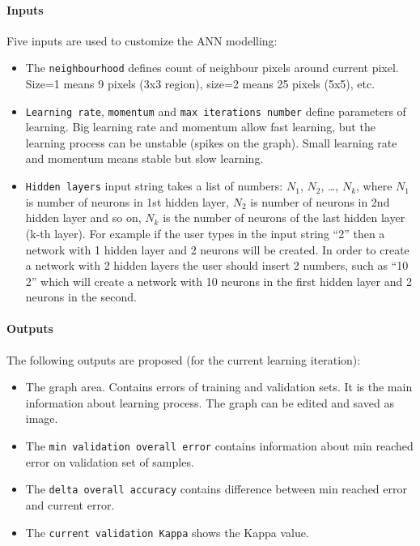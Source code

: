 \documentclass{report}
\begin{document}
\paragraph{Inputs} Five inputs are used to customize the ANN modelling:
\begin{itemize}
  \item The \verb+neighbourhood+ defines count of neighbour pixels around current pixel. Size=1 means 9
    pixels (3x3 region), size=2 means 25 pixels (5x5), etc.
  \item \verb+Learning rate+, \verb+momentum+ and \verb+max iterations number+ define parameters of learning. Big
    learning rate and momentum allow fast learning, but the learning process can be unstable
    (spikes on the graph). Small learning rate and momentum means stable but slow learning.
  \item \verb+Hidden layers+ input string takes a list of numbers: $N_1$, $N_2$,  \dots, $N_k$, where $N_1$ is number of
    neurons in 1st hidden layer, $N_2$ is number of neurons in 2nd hidden layer and so on, $N_k$ is the
    number of neurons of the last hidden layer (k-th layer). For example if the user types in the
    input string “2” then a network with 1 hidden layer and 2 neurons will be created. In order to
    create a network with 2 hidden layers the user should insert 2 numbers, such as “10 2”
    which will create a network with 10 neurons in the first hidden layer and 2 neurons in the
    second.
\end{itemize}


\paragraph{Outputs} The following outputs are proposed (for the current learning iteration):
\begin{itemize}
  \item The graph area. Contains errors of training and validation sets. It is the main information
about learning process. The graph can be edited and saved as image.
  \item The \verb+min validation overall error+ contains information about min reached error on validation
set of samples.
  \item The \verb+delta overall accuracy+ contains difference between min reached error and current error.
  \item The \verb+current validation Kappa+ shows the Kappa value.
\end{itemize}
\end{document}
